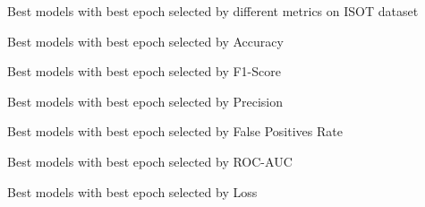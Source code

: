 \begin{table}[!htbp]
  \caption{Best models with best epoch selected by different metrics on ISOT dataset}
  \label{tab:isot_best_models}
  \centering

  \begin{subtable}[t]{\linewidth}
    \footnotesize
    \caption{Best models with best epoch selected by Accuracy}
    
  \end{subtable}

  \vspace{1em}

  \begin{subtable}[t]{\linewidth}
    \footnotesize
    \caption{Best models with best epoch selected by F1-Score}
    
  \end{subtable}

  \vspace{1em}

  \begin{subtable}[t]{\linewidth}
    \footnotesize
    \caption{Best models with best epoch selected by Precision}
    
  \end{subtable}

    \vspace{1em}

\begin{subtable}[t]{\linewidth}
    \footnotesize
    \caption{Best models with best epoch selected by False Positives Rate}
    
  \end{subtable}

  \vspace{1em}

  \begin{subtable}[t]{\linewidth}
    \footnotesize
    \caption{Best models with best epoch selected by ROC-AUC}
    
  \end{subtable}

    \vspace{1em}

  \begin{subtable}[t]{\linewidth}
    \footnotesize
    \caption{Best models with best epoch selected by Loss}
    
  \end{subtable}

\end{table}